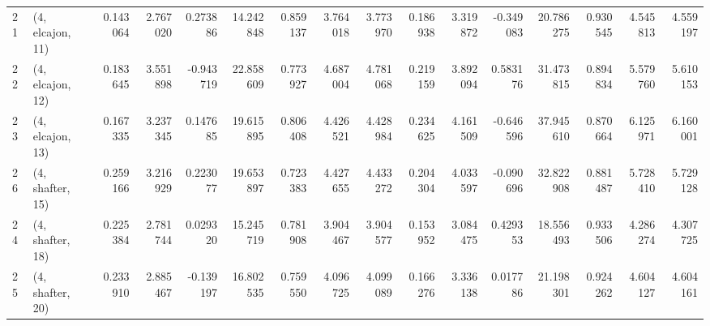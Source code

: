 \begin{tabular}{llrrrrrrrrrrrrrr}
21 &  (4, elcajon, 11) &   0.143064 &  2.767020 &  0.273886 &  14.242848 &  0.859137 &   3.764018 &  3.773970 &  0.186938 &  3.319872 & -0.349083 &   20.786275 &  0.930545 &   4.545813 &   4.559197 \\
22 &  (4, elcajon, 12) &   0.183645 &  3.551898 & -0.943719 &  22.858609 &  0.773927 &   4.687004 &  4.781068 &  0.219159 &  3.892094 &  0.583176 &   31.473815 &  0.894834 &   5.579760 &   5.610153 \\
23 &  (4, elcajon, 13) &   0.167335 &  3.237345 &  0.147685 &  19.615895 &  0.806408 &   4.426521 &  4.428984 &  0.234625 &  4.161509 & -0.646596 &   37.945610 &  0.870664 &   6.125971 &   6.160001 \\
26 &  (4, shafter, 15) &   0.259166 &  3.216929 &  0.223077 &  19.653897 &  0.723383 &   4.427655 &  4.433272 &  0.204304 &  4.033597 & -0.090696 &   32.822908 &  0.881487 &   5.728410 &   5.729128 \\
24 &  (4, shafter, 18) &   0.225384 &  2.781744 &  0.029320 &  15.245719 &  0.781908 &   3.904467 &  3.904577 &  0.153952 &  3.084475 &  0.429353 &   18.556493 &  0.933506 &   4.286274 &   4.307725 \\
25 &  (4, shafter, 20) &   0.233910 &  2.885467 & -0.139197 &  16.802535 &  0.759550 &   4.096725 &  4.099089 &  0.166276 &  3.336138 &  0.017786 &   21.198301 &  0.924262 &   4.604127 &   4.604161 \\
\bottomrule
\end{tabular}
